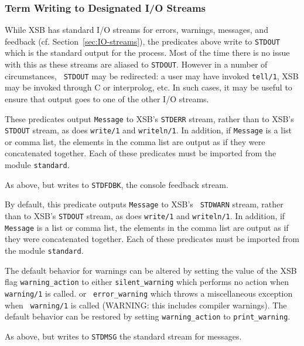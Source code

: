 \subsubsection{Term Writing to Designated I/O Streams}
%
While XSB has standard I/O streams for errors, warnings, messages, and
feedback (cf. Section~\ref{sec:IO-streams}), the predicates above
write to {\tt STDOUT} which is the standard output for the process.
Most of the time there is no issue with this as these streams are
aliased to {\tt STDOUT}.  However in a number of circumstances, {\tt
  STDOUT} may be redirected: a user may have invoked {\tt tell/1}, XSB
may be invoked through C or interprolog, etc.  In such cases, it may
be useful to ensure that output goes to one of the other I/O streams.  

\begin{description}

%
These predicates output {\tt Message} to XSB's {\tt STDERR} stream,
rather than to XSB's {\tt STDOUT} stream, as does {\tt write/1} and
{\tt writeln/1}.  In addition, if {\tt Message} is a list or comma
list, the elements in the comma list are output as if they were
concatenated together.  Each of these predicates must be imported from
the module {\tt standard}.

%
As above, but writes to {\tt STDFDBK}, the console feedback stream.

%
By default, this predicate outputs {\tt Message} to XSB's {\tt
  STDWARN} stream, rather than to XSB's {\tt STDOUT} stream, as does
{\tt write/1} and {\tt writeln/1}.  In addition, if {\tt Message} is a
list or comma list, the elements in the comma list are output as if
they were concatenated together.  Each of these predicates must be
imported from the module {\tt standard}.

The default behavior for warnings can be altered by setting the value
of the XSB flag {\tt warning\_action} to either {\tt silent\_warning}
which performs no action when {\tt warning/1} is called. or {\tt
  error\_warning} which throws a miscellaneous exception when {\tt
  warning/1} is called (WARNING: this includes compiler warnings).
The default behavior can be restored by setting {\tt warning\_action}
to {\tt print\_warning}.

%
As above, but writes to {\tt STDMSG} the standard stream for messages.

\end{description}

